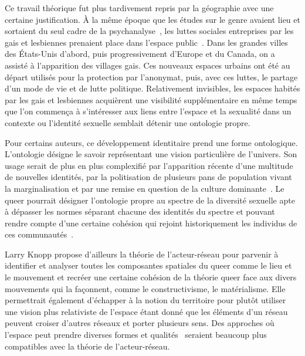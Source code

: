 Ce travail théorique fut plus tardivement repris par la géographie avec une certaine justification.
À la même époque que les études sur le genre avaient lieu et sortaient du seul cadre de la psychanalyse~\citep{Rubin2011a,Rubin2011}, les luttes sociales entreprises par les gais et lesbiennes prenaient place dans l'espace public~\citep[422-427]{Spencer2005}.
Dans les grandes villes des États-Unis d'abord, puis progressivement d'Europe et du Canada, on a assisté à l'apparition des villages gais.
Ces nouveaux espaces urbains ont été au départ utilisés pour la protection par l'anonymat, puis, avec ces luttes, le partage d'un mode de vie et de lutte politique.
Relativement invisibles, les espaces habités par les gais et lesbiennes acquièrent une visibilité supplémentaire en même temps que l'on commença à s'intéresser aux liens entre l'espace et la sexualité dans un contexte ou l'identité sexuelle semblait détenir une ontologie propre.

Pour certains auteurs, ce développement identitaire prend une forme ontologique.
L'ontologie désigne le savoir représentant une vision particulière de l'univers.
Son usage serait de plus en plus complexifié par l'apparition récente d'une multitude de nouvelles identités, par la politisation de plusieurs pans de population vivant la marginalisation et par une remise en question de la culture dominante~\citep[122]{Knopp2004}.
Le queer pourrait désigner l'ontologie propre au spectre de la diversité sexuelle apte à dépasser les normes séparant chacune des identités du spectre \lgbt{} et pouvant rendre compte d'une certaine cohésion qui rejoint historiquement les individus de ces communautés~\citep[122]{Knopp2004}.

Larry Knopp propose d'ailleurs la théorie de l'acteur-réseau pour parvenir à identifier et analyser toutes les composantes spatiales du queer comme le lieu et le mouvement et recréer une certaine cohésion de la théorie queer face aux divers mouvements qui la façonnent, comme le constructivisme, le matérialisme.
Elle permettrait également d'échapper à la notion du territoire pour plutôt utiliser une vision plus relativiste de l'espace étant donné que les éléments d'un réseau peuvent croiser d'autres réseaux et porter plusieurs sens.
Des approches où l'espace peut prendre diverses formes et qualités~\citep{DiMeo1998} seraient beaucoup plus compatibles avec la théorie de l'acteur-réseau.

